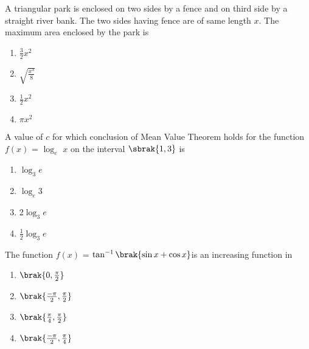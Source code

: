         \item A triangular park is enclosed on two sides by a fence and on third side by a straight river bank. The two sides having fence are of same length $x$.  The maximum area enclosed by the park is \hfill{}
         \begin{multicols}{4}
        \begin{enumerate}
        
            
        
            \item $\frac{3}{2}$$x^2$
        \item $\sqrt{\frac{x^3}{8}}$
        \item $\frac{1}{2}$$x^2$
        \item $\pi$$x^2$
    
        \end{enumerate}
        \end{multicols}
            
        \item A value of $c$ for which conclusion of Mean Value Theorem holds for the function $f(x)$ = $\log_e$ $x$ on the interval $\sbrak{1,3}$ is \hfill{}
         \begin{multicols}{4}
        \begin{enumerate}
        
            
        
            \item $\log_3$$e$
        \item $\log_e$3
        \item 2$\log_3$$e$
        \item $\frac{1}{2}$$\log_3$$e$

        \end{enumerate}
        \end{multicols}
            
        \item The function $f(x)$ = $\tan^{-1}\brak{\sin{x} + \cos{x}}$is an increasing function in \hfill{}
         \begin{multicols}{4}
    
        \begin{enumerate}
        
            
        
      \item $\brak{0,\frac{\pi}{2}}$
        \item $\brak{\frac{-\pi}{2},\frac{\pi}{2}}$
        \item $\brak{\frac{\pi}{4},\frac{\pi}{2}}$
        \item $\brak{\frac{-\pi}{2},\frac{\pi}{4}}$
        
            
        
            
        
        \end{enumerate}
        \end{multicols}
            
